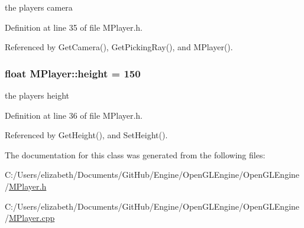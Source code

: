 the players camera 



Definition at line 35 of file M\+Player.\+h.



Referenced by Get\+Camera(), Get\+Picking\+Ray(), and M\+Player().

\subsubsection[{\texorpdfstring{height}{height}}]{\setlength{\rightskip}{0pt plus 5cm}float M\+Player\+::height = 150\hspace{0.3cm}{\ttfamily [protected]}}\hypertarget{class_m_player_aeea33a5b7179f159d03895adc5ad30ee}{}\label{class_m_player_aeea33a5b7179f159d03895adc5ad30ee}


the players height 



Definition at line 36 of file M\+Player.\+h.



Referenced by Get\+Height(), and Set\+Height().



The documentation for this class was generated from the following files\+:\begin{DoxyCompactItemize}
\item 
C\+:/\+Users/elizabeth/\+Documents/\+Git\+Hub/\+Engine/\+Open\+G\+L\+Engine/\+Open\+G\+L\+Engine/\hyperlink{_m_player_8h}{M\+Player.\+h}\item 
C\+:/\+Users/elizabeth/\+Documents/\+Git\+Hub/\+Engine/\+Open\+G\+L\+Engine/\+Open\+G\+L\+Engine/\hyperlink{_m_player_8cpp}{M\+Player.\+cpp}\end{DoxyCompactItemize}
